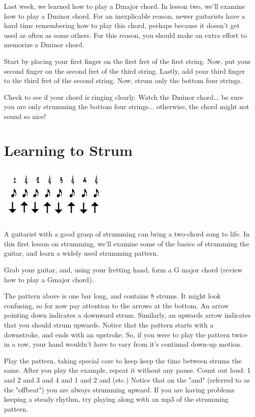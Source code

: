 Last week, we learned how to play a Dmajor chord. In lesson two, we'll examine how to play a Dminor chord. For an inexplicable reason, newer guitarists have a hard time remembering how to play this chord, perhaps because it doesn't get used as often as some others. For this reason, you should make an extra effort to memorize a Dminor chord.

Start by placing your first finger on the first fret of the first string. Now, put your second finger on the second fret of the third string. Lastly, add your third finger to the third fret of the second string. Now, strum only the bottom four strings.

Check to see if your chord is ringing clearly. Watch the Dminor chord... be sure you are only strumming the bottom four strings... otherwise, the chord might not sound so nice!

\section{Learning to Strum}
\includegraphics{parttwo/strum1.jpg}

A guitarist with a good grasp of strumming can bring a two-chord song to life. In this first lesson on strumming, we'll examine some of the basics of strumming the guitar, and learn a widely used strumming pattern.

Grab your guitar, and, using your fretting hand, form a G major chord (review how to play a Gmajor chord).

The pattern above is one bar long, and contains 8 strums. It might look confusing, so for now pay attention to the arrows at the bottom. An arrow pointing down indicates a downward strum. Similarly, an upwards arrow indicates that you should strum upwards. Notice that the pattern starts with a downstroke, and ends with an upstroke. So, if you were to play the pattern twice in a row, your hand wouldn't have to vary from it's continual down-up motion.

Play the pattern, taking special care to keep keep the time between strums the same. After you play the example, repeat it without any pause. Count out loud: 1 and 2 and 3 and 4 and 1 and 2 and (etc.) Notice that on the "and" (referred to as the "offbeat") you are always strumming upward. If you are having problems keeping a steady rhythm, try playing along with an mp3 of the strumming pattern.

